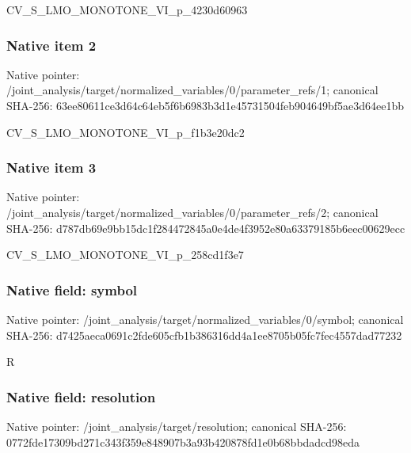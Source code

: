 \documentclass[10pt,a4paper]{article}
\begin{document}
\begingroup\raggedright\sloppy CV\_\allowbreak{}S\_\allowbreak{}LMO\_\allowbreak{}MONOTONE\_\allowbreak{}VI\_\allowbreak{}p\_\allowbreak{}4230d60963\par\endgroup

\subsubsection{Native item 2}
Native pointer: /joint\_\allowbreak{}analysis/target/normalized\_\allowbreak{}variables/0/parameter\_\allowbreak{}refs/1; canonical SHA-256: 63ee80611ce3d64c64eb5f6b6983b3d1e45731504feb904649bf5ae3d64ee1bb

\begingroup\raggedright\sloppy CV\_\allowbreak{}S\_\allowbreak{}LMO\_\allowbreak{}MONOTONE\_\allowbreak{}VI\_\allowbreak{}p\_\allowbreak{}f1b3e20dc2\par\endgroup

\subsubsection{Native item 3}
Native pointer: /joint\_\allowbreak{}analysis/target/normalized\_\allowbreak{}variables/0/parameter\_\allowbreak{}refs/2; canonical SHA-256: d787db69e9bb15dc1f284472845a0e4de4f3952e80a63379185b6eec00629ecc

\begingroup\raggedright\sloppy CV\_\allowbreak{}S\_\allowbreak{}LMO\_\allowbreak{}MONOTONE\_\allowbreak{}VI\_\allowbreak{}p\_\allowbreak{}258cd1f3e7\par\endgroup

\subsubsection{Native field: symbol}
Native pointer: /joint\_\allowbreak{}analysis/target/normalized\_\allowbreak{}variables/0/symbol; canonical SHA-256: d7425aeca0691c2fde605cfb1b386316dd4a1ee8705b05fc7fec4557dad77232

\begingroup\raggedright\sloppy R\par\endgroup

\subsubsection{Native field: resolution}
Native pointer: /joint\_\allowbreak{}analysis/target/resolution; canonical SHA-256: 0772fde17309bd271c343f359e848907b3a93b420878fd1e0b68bbdadcd98eda
\end{document}
